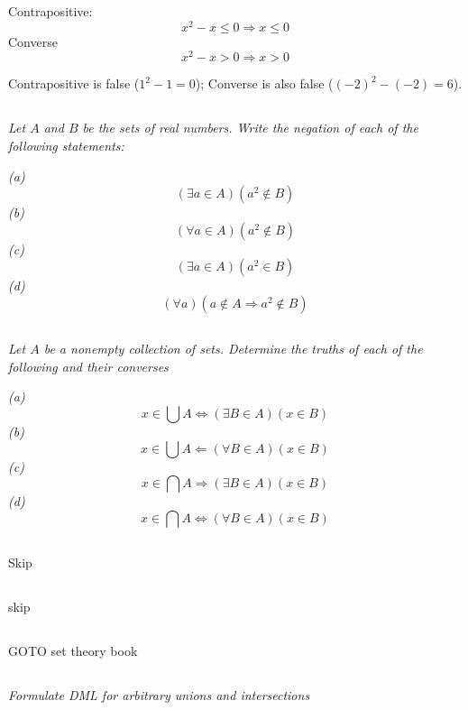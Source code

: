 \documentclass[11pt,oneside,titlepage]{book}
\DeclareMathOperator \lra {\Leftrightarrow}
\DeclareMathOperator \la {\Leftarrow}
\DeclareMathOperator \ra {\Rightarrow}
\begin{document}
Contrapositive:
$$x^2 - x \leq 0 \ra x \leq 0$$
Converse
$$ x^2 - x > 0 \ra x > 0 $$

Contrapositive is false ($1^2 - 1 = 0$); Converse is also false ($(-2)^2 - (-2) = 6$).

\subsection{}

\textit{Let $A$ and $B$ be the sets of real numbers. Write the negation of each of the
  following statements: }

\textit{(a)}
$$ (\exists a \in A)(a^2 \notin B)$$
\textit{(b)}
$$ (\forall a \in A)(a^2 \notin B)$$
\textit{(c)}
$$ (\exists a \in A)(a^2 \in B)$$
\textit{(d) }
$$ (\forall a)(a \notin A \ra a^2 \notin B)$$

\subsection{}

\textit{Let $A$ be a nonempty collection of sets. Determine the truths of each of the
  following and their converses}

\textit{(a)
$$x \in \bigcup{A} \lra (\exists B \in A)(x \in B)$$}
\textit{(b)
$$x \in \bigcup{A} \la (\forall B \in A)(x \in B)$$}
\textit{(c)
$$x \in \bigcap{A} \ra (\exists B \in A)(x \in B)$$}
\textit{(d)
$$x \in \bigcap{A} \lra (\forall B \in A)(x \in B)$$}

\subsection{}

Skip

\subsection{}

skip

\subsection{}

GOTO set theory book

\subsection{}

\textit{Formulate DML for arbitrary unions and intersections}
\end{document}

